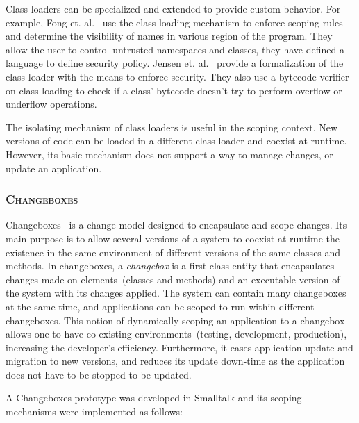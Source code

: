 Class loaders can be specialized and extended to provide custom behavior. For example, Fong et. al.~\cite{Fong10a} use the class loading mechanism to enforce scoping rules and determine the visibility of names in various region of the program. They allow the user to control untrusted
namespaces and classes, they have defined a language to define security policy. Jensen et. al.~\cite{Jens98a} provide a formalization of the class loader with the means to enforce security. They also use a bytecode verifier on class loading to check if a class' bytecode doesn't try to perform overflow or underflow operations.

The isolating mechanism of class loaders is useful in the scoping context. New versions of code can be loaded in a different class loader and coexist at runtime. However, its basic mechanism does not support a way to manage changes, or update an application.

\subsubsection*{\textsc{Changeboxes}}

Changeboxes~\cite{Denk07c} is a change model designed to encapsulate and scope changes. Its main purpose is to allow several versions of a system to coexist at runtime \ie the existence in the same environment of different versions of the same classes and methods. In changeboxes, a \emph{changebox} is a first-class entity that encapsulates changes made on elements~(classes and methods) and an executable version of the system with its changes applied. The system can contain many changeboxes at the same time, and applications can be scoped to run within different changeboxes. This notion of dynamically scoping an application to a changebox allows one to have co-existing environments~(\eg testing, development, production), increasing the developer's efficiency. Furthermore, it eases application update and migration to new versions, and reduces its update down-time as the application does not have to be stopped to be updated.

A Changeboxes prototype was developed in Smalltalk and its scoping mechanisms were implemented as follows:

